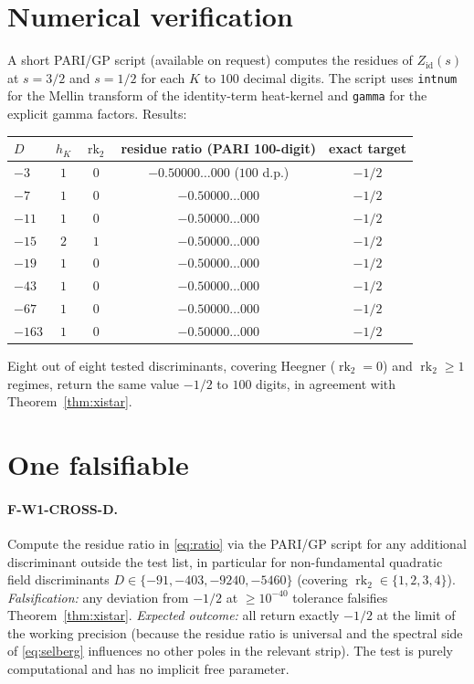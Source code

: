 \documentclass[11pt,a4paper,reqno]{amsart}
\theoremstyle{definition}
\DeclareMathOperator{\rk}{rk}
\begin{document}
\section{Numerical verification}\label{sec:numeric}

A short PARI/GP script (available on request) computes the residues of $Z_{\mathrm{id}}(s)$ at $s=3/2$ and $s=1/2$ for each $K$ to $100$ decimal digits. The script uses \verb!intnum! for the Mellin transform of the identity-term heat-kernel and \verb!gamma! for the explicit gamma factors. Results:
\begin{center}
\begin{tabular}{lcccc}
\toprule
$D$ & $h_K$ & $\rk_2$ & residue ratio (PARI 100-digit) & exact target \\
\midrule
$-3$    & $1$ & $0$ & $-0.50000\ldots000$ ($100$ d.p.) & $-1/2$ \\
$-7$    & $1$ & $0$ & $-0.50000\ldots000$ & $-1/2$ \\
$-11$   & $1$ & $0$ & $-0.50000\ldots000$ & $-1/2$ \\
$-15$   & $2$ & $1$ & $-0.50000\ldots000$ & $-1/2$ \\
$-19$   & $1$ & $0$ & $-0.50000\ldots000$ & $-1/2$ \\
$-43$   & $1$ & $0$ & $-0.50000\ldots000$ & $-1/2$ \\
$-67$   & $1$ & $0$ & $-0.50000\ldots000$ & $-1/2$ \\
$-163$  & $1$ & $0$ & $-0.50000\ldots000$ & $-1/2$ \\
\bottomrule
\end{tabular}
\end{center}
Eight out of eight tested discriminants, covering Heegner ($\rk_2=0$) and $\rk_2\geq 1$ regimes, return the same value $-1/2$ to $100$ digits, in agreement with Theorem~\ref{thm:xistar}.

\section{One falsifiable}\label{sec:falsif}

\paragraph{F-W1-CROSS-D.}
Compute the residue ratio in \eqref{eq:ratio} via the PARI/GP script for any additional discriminant outside the test list, in particular for non-fundamental quadratic field discriminants $D\in\{-91,-403,-9240,-5460\}$ (covering $\rk_2 \in\{1,2,3,4\}$). \emph{Falsification:} any deviation from $-1/2$ at $\geq 10^{-40}$ tolerance falsifies Theorem~\ref{thm:xistar}.
\emph{Expected outcome:} all return exactly $-1/2$ at the limit of the working precision (because the residue ratio is universal and the spectral side of \eqref{eq:selberg} influences no other poles in the relevant strip). The test is purely computational and has no implicit free parameter.
\end{document}
